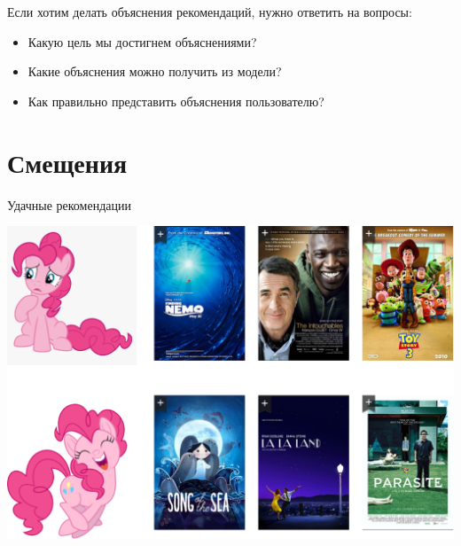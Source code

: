 \documentclass[11pt,aspectratio=169]{beamer}
\begin{document}
\begin{frame}

\begin{tcolorbox}[colback=info!5,colframe=info!80,title=]
Если хотим делать объяснения рекомендаций, нужно ответить на вопросы:
\begin{itemize}
\item Какую цель мы достигнем объяснениями?
\item Какие объяснения можно получить из модели?
\item Как правильно представить объяснения пользователю?
\end{itemize}
\end{tcolorbox}

\end{frame}

\section{Смещения}

\begin{frame}{Удачные рекомендации}

\begin{center}
\includegraphics[scale=0.22]{images/serendipity-pony.png}
\end{center}

\end{frame}
\end{document}
